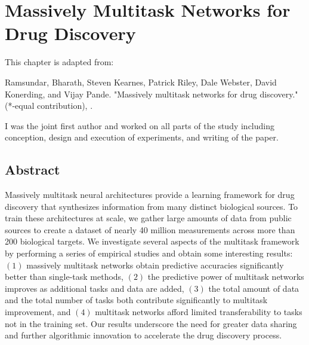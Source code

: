 

%

\section{Massively Multitask Networks for Drug Discovery}

This chapter is adapted from: 

Ramsundar, Bharath, Steven Kearnes, Patrick Riley, Dale Webster, David Konerding, and Vijay Pande. "Massively multitask networks for drug discovery." (*-equal contribution), \cite{ramsundar2015massively}. 


I was the joint first author and worked on all parts of the study including conception, design and execution of experiments, and writing of the paper.


\subsection{Abstract}
Massively multitask neural architectures provide a learning framework for
drug discovery that synthesizes information from many distinct biological
sources. To train these architectures at scale, we gather large amounts of
data from public sources to create a dataset of nearly 40 million
measurements across more than 200 biological targets. We investigate
several aspects of the multitask framework by performing a series of
empirical studies and obtain some interesting results: $(1)$ massively
multitask networks obtain predictive accuracies significantly better than
single-task methods, $(2)$ the predictive power of multitask networks
improves as additional tasks and data are added, $(3)$ the total amount of
data and the total number of tasks both contribute significantly to
multitask improvement, and $(4)$ multitask networks afford limited
transferability to tasks not in the training set. Our results underscore
the need for greater data sharing and further algorithmic innovation to
accelerate the drug discovery process.


